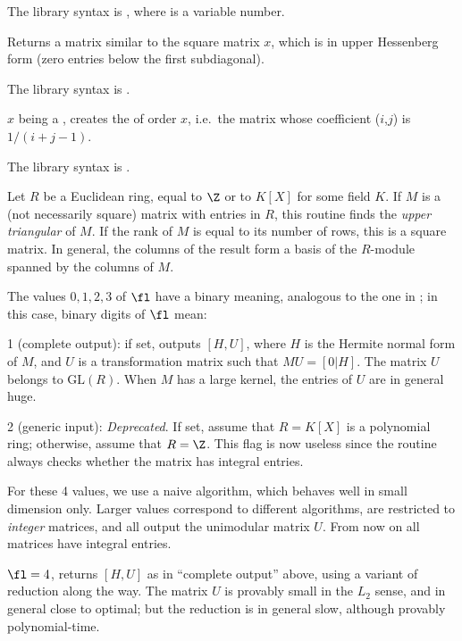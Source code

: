 The library syntax is , where  is a variable number.

\label{se:mathess}
Returns a matrix similar to the square matrix $x$, which is in upper Hessenberg
form (zero entries below the first subdiagonal).

The library syntax is .

\label{se:mathilbert}
$x$ being a , creates the
of order $x$, i.e.~the matrix whose coefficient
($i$,$j$) is $1/ (i+j-1)$.

The library syntax is .

\label{se:mathnf}
Let $R$ be a Euclidean ring, equal to $\Z$ or to $K[X]$ for some field
$K$. If $M$ is a (not necessarily square) matrix with entries in $R$, this
routine finds the \emph{upper triangular}  of $M$.
If the rank of $M$ is equal to its number of rows, this is a square
matrix. In general, the columns of the result form a basis of the $R$-module
spanned by the columns of $M$.

The values $0,1,2,3$ of $\fl$ have a binary meaning, analogous to the one
in ; in this case, binary digits of $\fl$ mean:

\item 1 (complete output): if set, outputs $[H,U]$, where $H$ is the Hermite
normal form of $M$, and $U$ is a transformation matrix such that $MU=[0|H]$.
The matrix $U$ belongs to $\text{GL}(R)$. When $M$ has a large kernel, the
entries of $U$ are in general huge.

\item 2 (generic input): \emph{Deprecated}. If set, assume that $R = K[X]$ is
a polynomial ring; otherwise, assume that $R = \Z$. This flag is now useless
since the routine always checks whether the matrix has integral entries.

\noindent For these 4 values, we use a naive algorithm, which behaves well
in small dimension only. Larger values correspond to different algorithms,
are restricted to \emph{integer} matrices, and all output the unimodular
matrix $U$. From now on all matrices have integral entries.

\item $\fl=4$, returns $[H,U]$ as in ``complete output'' above, using a
variant of  reduction along the way. The matrix $U$ is provably
small in the $L_2$ sense, and in general close to optimal; but the
reduction is in general slow, although provably polynomial-time.


